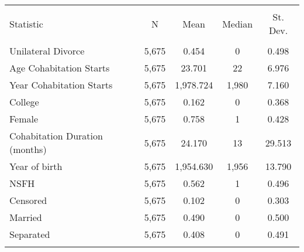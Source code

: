 
\begin{tabular}{@{\extracolsep{5pt}}lcccc} 
\\[-1.8ex]\hline 
\hline \\[-1.8ex] 
Statistic & \multicolumn{1}{c}{N} & \multicolumn{1}{c}{Mean} & \multicolumn{1}{c}{Median} & \multicolumn{1}{c}{St. Dev.} \\ 
\hline \\[-1.8ex] 
Unilateral Divorce & 5,675 & 0.454 & 0 & 0.498 \\ 
Age Cohabitation Starts & 5,675 & 23.701 & 22 & 6.976 \\ 
Year Cohabitation Starts & 5,675 & 1,978.724 & 1,980 & 7.160 \\ 
College & 5,675 & 0.162 & 0 & 0.368 \\ 
Female & 5,675 & 0.758 & 1 & 0.428 \\ 
Cohabitation Duration (months) & 5,675 & 24.170 & 13 & 29.513 \\ 
Year of birth & 5,675 & 1,954.630 & 1,956 & 13.790 \\ 
NSFH & 5,675 & 0.562 & 1 & 0.496 \\ 
Censored & 5,675 & 0.102 & 0 & 0.303 \\ 
Married & 5,675 & 0.490 & 0 & 0.500 \\ 
Separated & 5,675 & 0.408 & 0 & 0.491 \\ 
\hline \\[-1.8ex] 
\end{tabular} 
